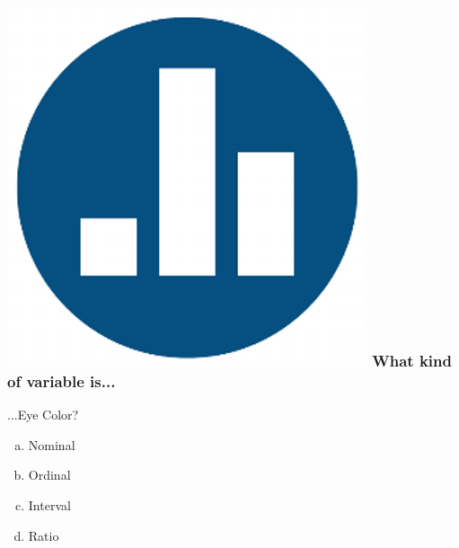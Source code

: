 \begin{frame}
\frametitle{\includegraphics[scale = 0.05]{./images/clicker} \hfill What kind of variable is...}
...Eye Color?
	\begin{enumerate}[(a)]
\item Nominal
\item Ordinal
\item Interval
\item Ratio
\end{enumerate}
\end{frame}

